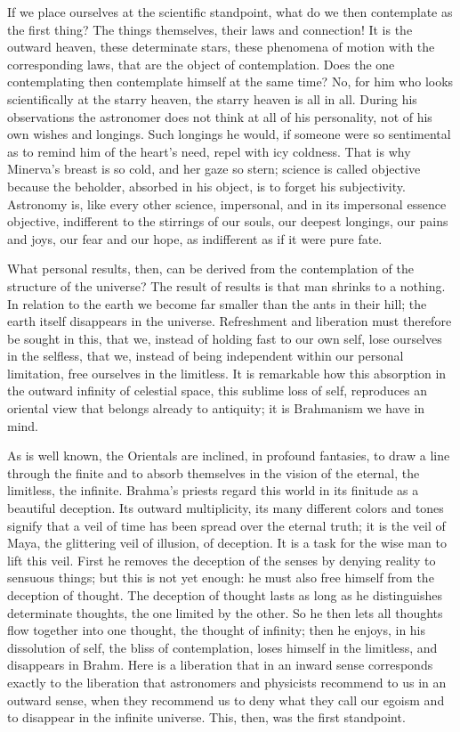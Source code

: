 \documentclass[12pt]{book}
\newcommand{\opage}[1]{\marginnote{\footnotesize\textit{[#1]}}}
\begin{document}
If we place ourselves at the scientific standpoint, what do we then
contemplate as the first thing? The things themselves, their laws and
connection! It is the outward heaven, these determinate stars, these
phenomena of motion with the corresponding laws, that are the object of
contemplation. Does the one contemplating then contemplate himself at the
same time? No, for him who looks scientifically at the starry heaven, the
starry heaven is all in all. During his observations the astronomer does
not think at all of his personality, not of his own wishes and longings.
Such longings he would, if someone were so sentimental as to remind him of
the heart's need, repel with icy coldness. That is why Minerva's breast is
so cold, and her gaze so stern;
science is called objective because the beholder, absorbed in his object,
is to forget his subjectivity. Astronomy is, like every other science,
impersonal, and in its impersonal essence objective, indifferent to the
stirrings of our souls, our deepest longings, our pains and joys, our fear
and our hope, as indifferent as if it were pure fate.

What personal results, then, can be derived from the contemplation of the
structure of the universe? The result of results is that man shrinks to a
nothing. In relation to the earth we become far smaller than the ants in
their hill; the earth itself disappears in the universe. Refreshment and
liberation must therefore be sought in this, that we, instead
\opage{199}\setcounter{footnote}{0}%
of holding fast to our own self, lose ourselves in the selfless, that we,
instead of being independent within our personal limitation, free
ourselves in the limitless. It is remarkable how this absorption in the
outward infinity of celestial space, this sublime loss of self, reproduces
an oriental view that belongs already to antiquity; it is Brahmanism we
have in mind.

As is well known, the Orientals are inclined, in profound fantasies, to
draw a line through the finite and to absorb themselves in the vision of
the eternal, the limitless, the infinite. Brahma's priests regard this
world in its finitude as a beautiful deception. Its outward multiplicity,
its many different colors and tones signify that a veil of time has been
spread over the eternal truth; it is the veil of Maya, the glittering veil
of illusion, of deception. It is a task for the wise man to lift this veil.
First he removes the deception of the senses by denying reality to sensuous
things; but this is not yet enough: he must also free himself from the
deception of thought. The deception of thought lasts as long as he
distinguishes determinate thoughts, the one limited by the other. So he
then lets all thoughts flow together into one thought, the thought of
infinity; then he enjoys, in his dissolution of self, the bliss of
contemplation, loses himself in the limitless, and disappears in Brahm.
Here is a liberation that in an inward sense corresponds exactly to the
liberation that astronomers and physicists recommend to us in an outward
sense, when they recommend us to deny what they call our egoism and to
disappear in the infinite universe. This, then, was the first standpoint.
\end{document}
